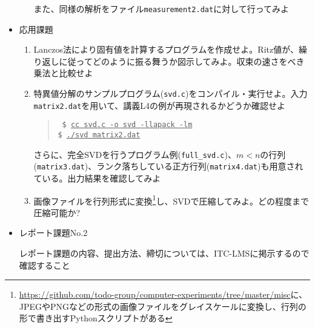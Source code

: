 \documentclass[11pt]{jarticle}
\begin{document}
\begin{itemize}
\begin{enumerate}
    また、同様の解析をファイル{\tt measurement2.dat}に対して行ってみよ
  \end{enumerate}  
\item 応用課題
  \begin{enumerate}
  \item Lanczos法により固有値を計算するプログラムを作成せよ。Ritz値が、繰り返しに従ってどのように振る舞うか図示してみよ。収束の速さをべき乗法と比較せよ
  \item 特異値分解のサンプルプログラム({\tt svd.c})をコンパイル・実行せよ。入力{\tt matrix2.dat}を用いて、講義L4の例が再現されるかどうか確認せよ
    \begin{quote} \tt
      \$ \underline{cc svd.c -o svd -llapack -lm} \\
      \$ \underline{./svd matrix2.dat}
    \end{quote}
    さらに、完全SVDを行うプログラム例({\tt full\_svd.c})、$m<n$の行列({\tt matrix3.dat})、ランク落ちしている正方行列({\tt matrix4.dat})も用意されている。出力結果を確認してみよ
  \item 画像ファイルを行列形式に変換\footnote{\url{https://github.com/todo-group/computer-experiments/tree/master/misc}に、JPEGやPNGなどの形式の画像ファイルをグレイスケールに変換し、行列の形で書き出すPythonスクリプトがある}し、SVDで圧縮してみよ。どの程度まで圧縮可能か?
  \end{enumerate}  

\item レポート課題No.2

  レポート課題の内容、提出方法、締切については、ITC-LMSに掲示するので確認すること
\end{itemize}
\end{document}
